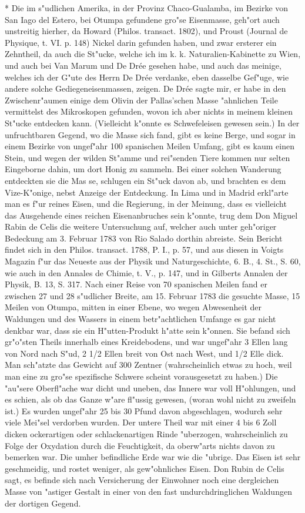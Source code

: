 \documentclass[a4paper, 11pt, oneside, polutonikogreek, german]{article}
\begin{document}
* Die im s"udlichen Amerika, in der Provinz Chaco-Gualamba, im Bezirke von San Iago del Estero, bei Otumpa gefundene gro"se Eisenmasse, geh"ort auch unstreitig hierher, da Howard (Philos. transact. 1802), und Proust (Journal de Physique, t. VI. p. 148) Nickel darin gefunden haben, und zwar ersterer ein Zehntheil, da auch die St"ucke, welche ich im k. k. Naturalien-Kabinette zu Wien, und auch bei Van Marum und De Drée gesehen habe, und auch das meinige, welches ich der G"ute des Herrn De Drée verdanke, eben dasselbe Gef"uge, wie andere solche Gediegeneisenmassen, zeigen. De Drée sagte mir, er habe in den Zwischenr"aumen einige dem Olivin der Pallas'schen Masse "ahnlichen Teile vermittelst des Mikroskopen gefunden, wovon ich aber nichts in meinem kleinen St"ucke entdecken kann. (Vielleicht k"onnte es Schwefeleisen gewesen sein.) In der unfruchtbaren Gegend, wo die Masse sich fand, gibt es keine Berge, und sogar in einem Bezirke von ungef"ahr 100 spanischen Meilen Umfang, gibt es kaum einen Stein, und wegen der wilden St"amme und rei"senden Tiere kommen nur selten Eingeborne dahin, um dort Honig zu sammeln. Bei einer solchen Wanderung entdeckten sie die Mas se, schlugen ein St"uck davon ab, und brachten es dem Vize-K"onige, nebst Anzeige der Entdeckung. In Lima und in Madrid erkl"arte man es f"ur reines Eisen, und die Regierung, in der Meinung, dass es vielleicht das Ausgehende eines reichen Eisenanbruches sein k"onnte, trug dem Don Miguel Rabin de Celis die weitere Untersuchung auf, welcher auch unter geh"origer Bedeckung am 3. Februar 1783 von Rio Salado dorthin abreiste. Sein Bericht findet sich in den Philos. transact. 1788, P. I., p. 57, und aus diesen in Voigts Magazin f"ur das Neueste aus der Physik und Naturgeschichte, 6. B., 4. St., S. 60, wie auch in den Annales de Chimie, t. V., p. 147, und in Gilberts Annalen der Physik, B. 13, S. 317. Nach einer Reise von 70 spanischen Meilen fand er zwischen 27 und 28 s"udlicher Breite, am 15. Februar 1783 die gesuchte Masse, 15 Meilen von Otumpa, mitten in einer Ebene, wo wegen Abwesenheit der Waldungen und des Wassers in einem betr"achtlichen Umfange es gar nicht denkbar war, dass sie ein H"utten-Produkt h"atte sein k"onnen. Sie befand sich gr"o"sten Theils innerhalb eines Kreidebodens, und war ungef"ahr 3 Ellen lang von Nord nach S"ud, 2 1/2 Ellen breit von Ost nach West, und 1/2 Elle dick. Man sch"atzte das Gewicht auf 300 Zentner (wahrscheinlich etwas zu hoch, weil man eine zu gro"se spezifische Schwere scheint vorausgesetzt zu haben.) Die "au"sere Oberfl"ache war dicht und uneben, das Innere war voll H"ohlungen, und es schien, als ob das Ganze w"are fl"ussig gewesen, (woran wohl nicht zu zweifeln ist.) Es wurden ungef"ahr 25 bis 30 Pfund davon abgeschlagen, wodurch sehr viele Mei"sel verdorben wurden. Der untere Theil war mit einer 4 bis 6 Zoll dicken ockerartigen oder schlackenartigen Rinde "uberzogen, wahrscheinlich zu Folge der Oxydation durch die Feuchtigkeit, da oberw"arts nichts davon zu bemerken war. Die umher befindliche Erde war wie die "ubrige. Das Eisen ist sehr geschmeidig, und rostet weniger, als gew"ohnliches Eisen. Don Rubin de Celis sagt, es befinde sich nach Versicherung der Einwohner noch eine dergleichen Masse von "astiger Gestalt in einer von den fast undurchdringlichen Waldungen der dortigen Gegend. 
\end{document}
